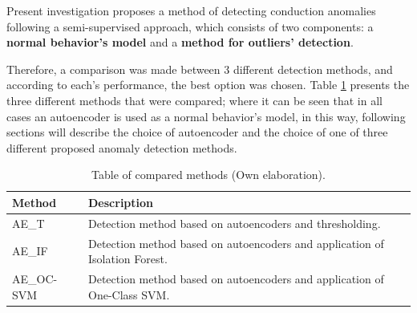 Present investigation proposes a method of detecting conduction anomalies following a semi-supervised approach, which consists of two components: a \textbf{normal behavior's model} and a \textbf{method for outliers' detection}.

\vspace{5mm} %

Therefore, a comparison was made between 3 different detection methods, and according to each's performance, the best option was chosen. Table \ref{table:metodos_comparados} presents the three different methods that were compared; where it can be seen that in all cases an autoencoder is used as a normal behavior's model, in this way, following sections will describe the choice of autoencoder and the choice of one of three different proposed anomaly detection methods.

\begin{table}[H]
\centering
\begin{tabular}{|l|p{100mm}|}
\hline
\textbf{Method} & \textbf{Description} \\ \hline
AE\_T & Detection method based on autoencoders and thresholding. \\ \hline
AE\_IF & Detection method based on autoencoders and application of Isolation Forest. \\ \hline
AE\_OC-SVM & Detection method based on autoencoders and application of One-Class SVM. \\ \hline
\end{tabular}
\caption{Table of compared methods (Own elaboration).}
\label{table:metodos_comparados}
\end{table}

